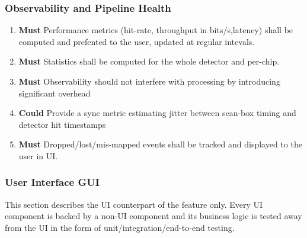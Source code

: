 \documentclass[10pt]{article}
\newcommand{\PriorityTag}[2]{%
    \colorbox{#2!25}{\footnotesize\textsf{\textbf{#1}}}\hspace{0.6em}}
\newcommand{\must}{\leavevmode\PriorityTag{Must}{green}}
\newcommand{\could}{\leavevmode\PriorityTag{Could}{cyan}}
\newcounter{reqgrp}[section] %
\newcounter{reqno}
\newcommand{\reqprefix}{GEN}
\newenvironment{requirements}[1]{%
    \renewcommand{\reqprefix}{#1}%
    \refstepcounter{reqgrp}%
    \setcounter{reqno}{0}%
    \begin{enumerate}[leftmargin=*]
    }{\end{enumerate}}
\begin{document}
    \subsubsection{Observability and Pipeline Health}
    \begin{requirements}{OBS}

        \item \must {}
        {Performance metrics (hit-rate, throughput in bits/s,latency) shall be computed and prefented to the user, updated at regular intevals.}

        \item \must {}
        {Statistics shall be computed for the whole detector and per-chip.}

        \item \must {}
        {Observability should not interfere with processing by introducing significant overhead}

        \item \could {}
        {Provide a sync metric estimating jitter between scan-box timing and detector hit timestamps}

        \item \must {}
        {Dropped/lost/mis-mapped events shall be tracked and displayed to the user in UI.}
    \end{requirements}

    \subsubsection{User Interface GUI}

    This section describes the UI counterpart of the feature only. Every UI component is backed by a non-UI component and its business logic is tested away from the UI in the form of unit/integration/end-to-end testing.
\end{document}
